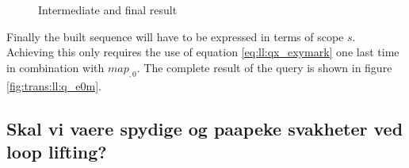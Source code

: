 \begin{figure}[!h]
\centering
{}
\qquad
{}
\qquad
{}
\label{fig:trans:ll:endExample}
\caption{Intermediate and final result}
\end{figure}

Finally the built sequence will have to be expressed in terms of scope $s$. Achieving this only requires the use
of equation \ref{eq:ll:qx_exymark} one last time in combination with $map_{ ,0}$. The complete result of the query
is shown in figure \ref{fig:trans:ll:q_e0m}.

\subsection{Skal vi vaere spydige og paapeke svakheter ved loop lifting?}
